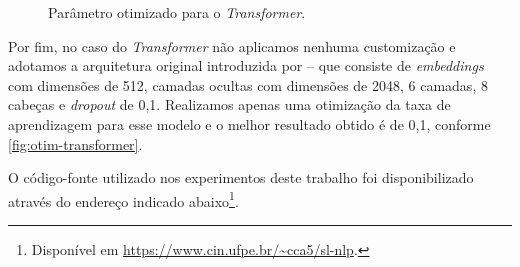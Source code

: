 \begin{figure}[ht!]
    \centering
    \caption{\textmd{Parâmetro otimizado para o \textit{Transformer}.}}
    \nomefonte{}
    \label{fig:otim-transformer}
\end{figure}



Por fim, no caso do \textit{Transformer} não aplicamos nenhuma customização e adotamos a arquitetura original introduzida por  -- que consiste de \textit{embeddings} com dimensões de 512, camadas ocultas com dimensões de 2048, 6 camadas, 8 cabeças e \textit{dropout} de 0,1.
Realizamos apenas uma otimização da taxa de aprendizagem para esse modelo e o melhor resultado obtido é de 0,1, conforme \autoref{fig:otim-transformer}.


O código-fonte utilizado nos experimentos deste trabalho foi disponibilizado através do endereço indicado abaixo\footnote{
    Disponível em \url{https://www.cin.ufpe.br/~cca5/sl-nlp}.
}.




